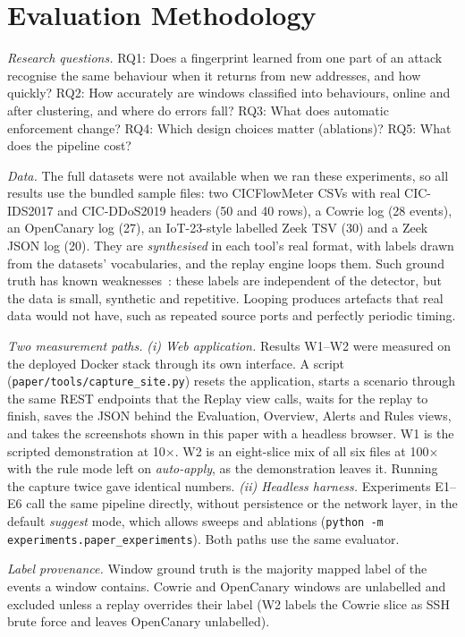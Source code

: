 \documentclass[conference]{IEEEtran}
\begin{document}
\section{Evaluation Methodology}\label{sec:eval}
\textit{Research questions.} RQ1: Does a fingerprint learned from one part of an attack recognise the same behaviour when it returns from new addresses, and how quickly? RQ2: How accurately are windows classified into behaviours, online and after clustering, and where do errors fall? RQ3: What does automatic enforcement change? RQ4: Which design choices matter (ablations)? RQ5: What does the pipeline cost?

\textit{Data.} The full datasets were not available when we ran these experiments, so all results use the bundled sample files: two CICFlowMeter CSVs with real CIC-IDS2017 and CIC-DDoS2019 headers (50 and 40 rows), a Cowrie log (28 events), an OpenCanary log (27), an IoT-23-style labelled Zeek TSV (30) and a Zeek JSON log (20). They are \emph{synthesised} in each tool's real format, with labels drawn from the datasets' vocabularies, and the replay engine loops them. Such ground truth has known weaknesses~\cite{oliveira2026,aparna2026}: these labels are independent of the detector, but the data is small, synthetic and repetitive. Looping produces artefacts that real data would not have, such as repeated source ports and perfectly periodic timing.

\textit{Two measurement paths.} \emph{(i) Web application.} Results W1--W2 were measured on the deployed Docker stack through its own interface. A script (\texttt{paper/tools/capture\_site.py}) resets the application, starts a scenario through the same REST endpoints that the Replay view calls, waits for the replay to finish, saves the JSON behind the Evaluation, Overview, Alerts and Rules views, and takes the screenshots shown in this paper with a headless browser. W1 is the scripted demonstration at 10$\times$. W2 is an eight-slice mix of all six files at 100$\times$ with the rule mode left on \emph{auto-apply}, as the demonstration leaves it. Running the capture twice gave identical numbers. \emph{(ii) Headless harness.} Experiments E1--E6 call the same pipeline directly, without persistence or the network layer, in the default \emph{suggest} mode, which allows sweeps and ablations (\texttt{python -m experiments.paper\_experiments}). Both paths use the same evaluator.

\textit{Label provenance.} Window ground truth is the majority mapped label of the events a window contains. Cowrie and OpenCanary windows are unlabelled and excluded unless a replay overrides their label (W2 labels the Cowrie slice as SSH brute force and leaves OpenCanary unlabelled).
\end{document}
